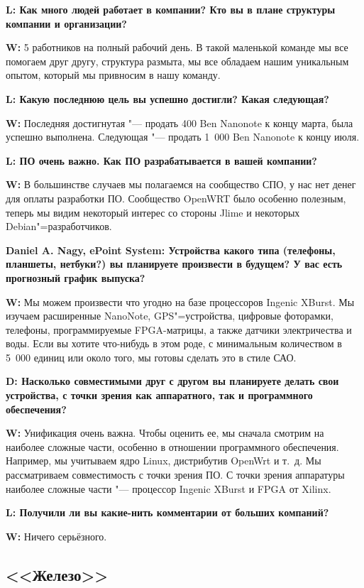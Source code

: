 \documentclass[10pt, a5paper]{article}
\begin{document}
{\noindent \bf L: Как много людей работает в компании? Кто вы в плане структуры компании и организации?}

{\noindent \bf W:} 5 работников на полный рабочий день. В такой маленькой команде мы все помогаем друг другу, структура размыта, мы все обладаем нашим уникальным опытом, который мы привносим в нашу команду.

{\noindent \bf L: Какую последнюю цель вы успешно достигли? Какая следующая?}

{\noindent \bf W:} Последняя достигнутая "--- продать 400 Ben Nanonote к концу марта, была успешно выполнена. Следующая "--- продать 1~000 Ben Nanonote к концу июля.

{\noindent \bf L: ПО очень важно. Как ПО разрабатывается в вашей компании?}

{\noindent \bf W:} В большинстве случаев мы полагаемся на сообщество СПО, у нас нет денег для оплаты разработки ПО. Сообщество OpenWRT было особенно полезным, теперь мы видим некоторый интерес со стороны Jlime и некоторых Debian"=разработчиков.

{\noindent \bf Daniel A. Nagy, ePoint System: Устройства какого типа (телефоны, планшеты, нетбуки?) вы планируете произвести в будущем? У вас есть прогнозный график выпуска?}

{\noindent \bf W:} Мы можем произвести что угодно на базе процессоров Ingenic XBurst. Мы изучаем расширенные NanoNote, GPS"=устройства, цифровые фоторамки, телефоны, программируемые FPGA-матрицы, а также датчики электричества и воды. Если вы хотите что-нибудь в этом роде, с минимальным количеством в 5~000 единиц или около того, мы готовы сделать это в стиле САО.

{\noindent \bf D: Насколько совместимыми друг с другом вы планируете делать свои устройства, с точки зрения как аппаратного, так и программного обеспечения?}

{\noindent \bf W:} Унификация очень важна. Чтобы оценить ее, мы сначала смотрим на наиболее сложные части, особенно в отношении программного обеспечения. Например, мы учитываем ядро Linux, дистрибутив OpenWrt и т.~д. Мы рассматриваем совместимость с точки зрения ПО. С точки зрения аппаратуры наиболее сложные части "--- процессор Ingenic XBurst и FPGA от Xilinx.

{\noindent \bf L: Получили ли вы какие-нить комментарии от больших компаний?}

{\noindent \bf W:} Ничего серьёзного.

\subsection*{<<Железо>>}
\end{document}
